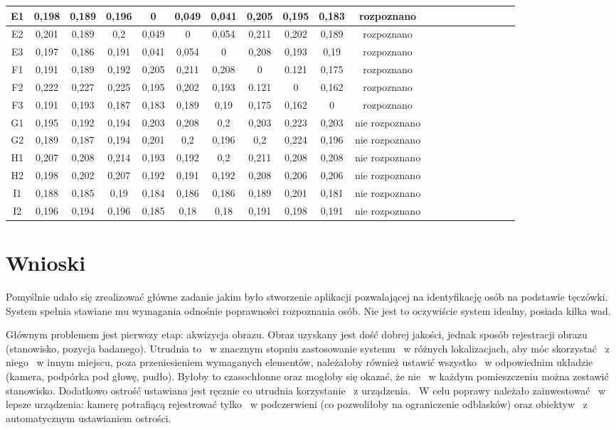 \begin{table}
\begin{center}
\begin{tabular}{|c|c|c|c|c|c|c|c|c|c|c|c|c|c|c|c|c|c|c|l|}
E1 & 0,198&0,189&0,196&0&0,049&0,041&0,205&0,195&0,183 & rozpoznano\\ \hline
E2 & 0,201&0,189&0,2&0,049&0&0,054&0,211&0,202&0,189 & rozpoznano\\ \hline
E3 & 0,197&0,186&0,191&0,041&0,054&0&0,208&0,193&0,19 & rozpoznano\\ \hline
F1 & 0,191&0,189&0,192&0,205&0,211&0,208&0&0.121&0,175 & rozpoznano\\ \hline
F2 & 0,222&0,227&0,225&0,195&0,202&0,193&0.121&0&0,162 & rozpoznano\\ \hline
F3 & 0,191&0,193&0,187&0,183&0,189&0,19&0,175&0,162&0 & rozpoznano\\ \hline
G1 & 0,195&0,192&0,194&0,203&0,208&0,2&0,203&0,223&0,203 & nie rozpoznano\\ \hline
G2 & 0,189&0,187&0,194&0,201&0,2&0,196&0,2&0,224&0,196 & nie rozpoznano\\ \hline
H1 & 0,207&0,208&0,214&0,193&0,192&0,2&0,211&0,208&0,208 & nie rozpoznano\\ \hline
H2 & 0,198&0,202&0,207&0,192&0,191&0,192&0,208&0,206&0,206 & nie rozpoznano\\ \hline
I1 & 0,188&0,185&0,19&0,184&0,186&0,186&0,189&0,201&0,181 & nie rozpoznano\\ \hline
I2 & 0,196&0,194&0,196&0,185&0,18&0,18&0,191&0,198&0,191 & nie rozpoznano\\ \hline
\end{tabular}
\end{center}
\end{table}

\section{Wnioski}
\label{sec:wnioski}

Pomyślnie udało się zrealizować główne zadanie jakim było stworzenie aplikacji pozwalającej na identyfikację osób na podstawie tęczówki. System spełnia stawiane mu wymagania odnośnie poprawności rozpoznania osób. Nie jest to oczywiście system idealny, posiada kilka wad.

Głównym problemem jest pierwszy etap: akwizycja obrazu. Obraz uzyskany jest dość dobrej jakości, jednak sposób rejestracji obrazu (stanowisko, pozycja badanego). Utrudnia to ~w znacznym stopniu zastosowanie systemu ~w różnych lokalizacjach, aby móc skorzystać ~z niego ~w innym miejscu, poza przeniesieniem wymaganych elementów, należałoby również ustawić wszystko ~w odpowiednim układzie (kamera, podpórka pod głowę, pudło). Byłoby to czasochłonne oraz mogłoby się okazać, że nie ~w każdym pomieszczeniu można zestawić stanowisko. Dodatkowo ostrość ustawiana jest ręcznie co utrudnia korzystanie ~z urządzenia. ~W celu poprawy należało zainwestować ~w lepsze urządzenia: kamerę potrafiącą rejestrować tylko ~w podczerwieni (co pozwoliłoby na ograniczenie odblasków) oraz obiektyw ~z automatycznym ustawianiem ostrości.

